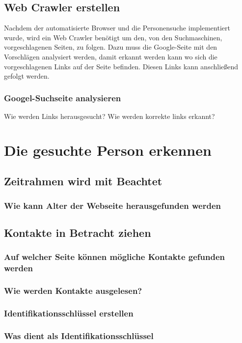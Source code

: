 	\subsection{Web Crawler erstellen}
	Nachdem der automatisierte Browser und die Personensuche implementiert wurde, wird ein Web Crawler benötigt um den, von den Suchmaschinen, vorgeschlagenen Seiten, zu folgen. Dazu muss die Google-Seite mit den Vorschlägen analysiert werden, damit erkannt werden kann wo sich die vorgeschlagenen Links auf der Seite befinden. Diesen Links kann anschließend gefolgt werden.
		\subsubsection{Googel-Suchseite analysieren}
		Wie werden Links herausgesucht?
		Wie werden korrekte links erkannt?
		
	
\section{Die gesuchte Person erkennen}
	\subsection{Zeitrahmen wird mit Beachtet}
		\subsubsection{Wie kann Alter der Webseite herausgefunden werden}
	\subsection{Kontakte in Betracht ziehen}
		\subsubsection{Auf welcher Seite können mögliche Kontakte gefunden werden}
		\subsubsection{Wie werden Kontakte ausgelesen?}
	\subsubsection{Identifikationsschlüssel erstellen}
		\subsubsection{Was dient als Identifikationsschlüssel}
		
